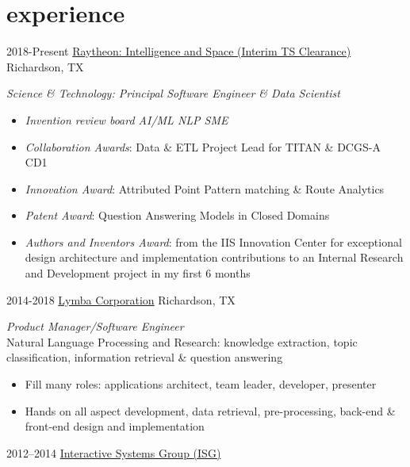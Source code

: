 \documentclass[]{friggeri-cv} %
\begin{document}

\section{experience }

\begin{entrylist}
\entry
{2018-Present}
{\href{http://www.raytheon.com}{Raytheon: Intelligence and Space {\normalfont (Interim TS Clearance)}}}
{Richardson, TX}
{\emph{Science \& Technology: Principal Software Engineer \& Data Scientist}
\begin{itemize}
\item \emph{Invention review board AI/ML NLP SME}
\item \emph{Collaboration Awards}: Data \& ETL Project Lead for TITAN \& DCGS-A CD1
\item \emph{Innovation Award}: Attributed Point Pattern matching \& Route Analytics
\item \emph{Patent Award}: Question Answering Models in Closed Domains
\item \emph{Authors and Inventors Award}: from the IIS Innovation Center for exceptional design architecture and implementation contributions to an Internal Research and Development project in my first 6 months
\end{itemize}}
\entry
{2014-2018}
{\href{http://www.lymba.com}{Lymba Corporation}}
{Richardson, TX}
{\emph{Product Manager/Software Engineer} \\
Natural Language Processing and Research: knowledge extraction, topic classification, information retrieval \& question answering
\begin{itemize}
\item Fill many roles: applications architect, team leader, developer, presenter
\end{itemize}
\begin{itemize}
\item Hands on all aspect development, data retrieval, pre-processing, back-end \& front-end design and implementation
\end{itemize}}
\entry
{2012--2014}
{\href{http://isg.cs.utep.edu/}{Interactive Systems Group  {\normalfont (ISG)}}}

\end{entrylist}
\end{document}

